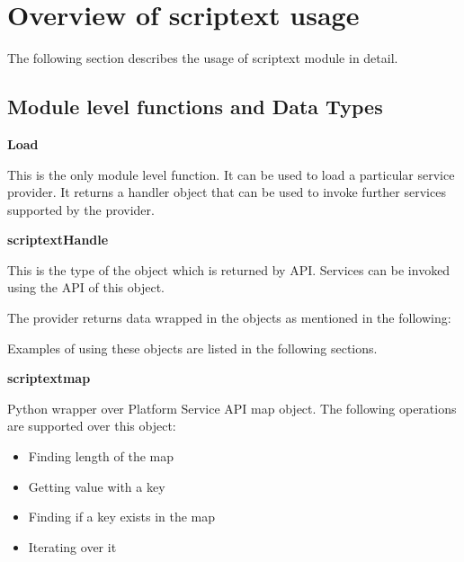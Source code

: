 %
%
%

\section{Overview of scriptext usage}
\label{sec:scriptextpyruntime}

The following section describes the usage of scriptext module in detail.

\subsection{Module level functions and Data Types}
\label{subsec:pydatatypes}

{\bf Load} \break

This is the only module level function. It can be used to load a particular service provider. It returns a handler object that can be used to invoke further services supported by the provider.

{\bf scriptextHandle} \break

This is the type of the object which is returned by  API. Services can be invoked using the  API of this object.

The provider returns data wrapped in the objects as mentioned in the following:

\begin{notice}[note]
Examples of using these objects are listed in the following sections.
\end{notice}

{\bf scriptextmap} \break

Python wrapper over Platform Service API map object. The following operations are supported over this object:

\begin{itemize}
\item Finding length of the map
\item Getting value with a key
\item Finding if a key exists in the map
\item Iterating over it
\end{itemize}

